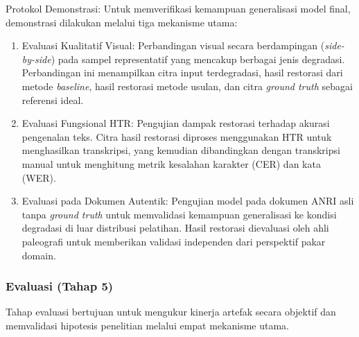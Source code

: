 Protokol Demonstrasi: Untuk memverifikasi kemampuan generalisasi model final, demonstrasi dilakukan melalui tiga mekanisme utama:
\begin{enumerate}[label=(\arabic*), nosep]
    \item Evaluasi Kualitatif Visual: Perbandingan visual secara berdampingan (\textit{side-by-side}) pada sampel representatif yang mencakup berbagai jenis degradasi. Perbandingan ini menampilkan citra input terdegradasi, hasil restorasi dari metode \textit{baseline}, hasil restorasi metode usulan, dan citra \textit{ground truth} sebagai referensi ideal.
    \item Evaluasi Fungsional HTR: Pengujian dampak restorasi terhadap akurasi pengenalan teks. Citra hasil restorasi diproses menggunakan HTR untuk menghasilkan transkripsi, yang kemudian dibandingkan dengan transkripsi manual untuk menghitung metrik kesalahan karakter (CER) dan kata (WER).
    \item Evaluasi pada Dokumen Autentik: Pengujian model pada dokumen ANRI asli tanpa \textit{ground truth} untuk memvalidasi kemampuan generalisasi ke kondisi degradasi di luar distribusi pelatihan. Hasil restorasi dievaluasi oleh ahli paleografi untuk memberikan validasi independen dari perspektif pakar domain.
\end{enumerate}

\subsubsection{Evaluasi (Tahap 5)}
Tahap evaluasi bertujuan untuk mengukur kinerja artefak secara objektif dan memvalidasi hipotesis penelitian melalui empat mekanisme utama.

